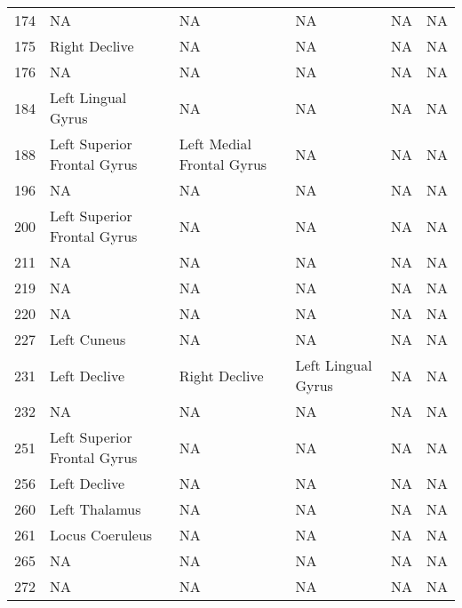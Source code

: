 \documentclass[10pt,letterpaper]{article}\usepackage[]{graphicx}\usepackage[]{color}
\begin{document}
\begin{center}
\begin{longtable}[c]{cP{1.1in}P{1.1in}P{1.1in}cc}
		174	& NA & NA & NA & NA	& NA \\
		175	& Right Declive	& NA & NA & NA & NA \\
		176	& NA & NA & NA & NA	& NA \\
		184	& Left Lingual Gyrus & NA & NA & NA	& NA \\
		188	& Left Superior Frontal Gyrus & Left Medial Frontal Gyrus & NA & NA	& NA \\
		196	& NA & NA & NA & NA	& NA \\
		200	& Left Superior Frontal Gyrus & NA & NA	& NA & NA \\
		211	& NA & NA & NA & NA	& NA \\
		219	& NA & NA & NA & NA	& NA \\
		220	& NA & NA & NA & NA	& NA \\
		227	& Left Cuneus & NA & NA	& NA & NA \\
		231	& Left Declive & Right Declive & Left Lingual Gyrus	& NA & NA \\
		232	& NA & NA & NA & NA	& NA \\
		251	& Left Superior Frontal Gyrus & NA & NA	& NA & NA \\
		256	& Left Declive & NA	& NA & NA & NA \\
		260	& Left Thalamus	& NA & NA & NA & NA \\
		261	& Locus Coeruleus & NA & NA	& NA & NA \\
		265	& NA & NA & NA & NA	& NA \\
		272	& NA & NA & NA & NA	& NA \\
	\end{longtable}
\end{center}
\end{document}
